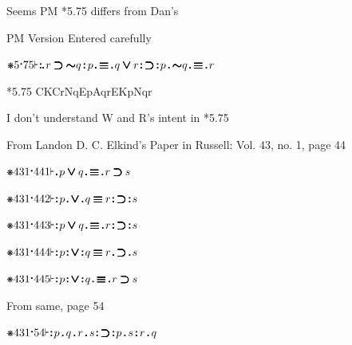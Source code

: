 \documentclass[12pt]{article}
\newcommand{\pmthm}{\mathpunct{\text{\scalebox{.5}[1]{$\boldsymbol\vdash$}}}} %
\newcommand{\pmast}{\text{\resizebox{!}{.75\height}{\ding{107}}}} %
\newcommand{\pmcdot}{\text{\raisebox{.05cm}{$\boldsymbol\cdot$}}} %
\newcommand{\pmd}{\hbox{\rule{.3ex}{.3ex}}} %
\newcommand{\pmdd}{\overset{\pmd}{\pmd}} %
\newcommand{\pmdot}{\mathinner{\pmd}}
\newcommand{\pmdott}{\mathinner{\pmdd}}
\newcommand{\pmdottt}{\mathinner{\pmdd\hspace{1pt}\pmd}}
\newcommand{\pmnot}{\mathord{\ooalign{$\boldsymbol{\sim}\mkern.5mu$\hidewidth\cr$\boldsymbol{\sim}$\cr\hidewidth$\mkern.5mu\boldsymbol{\sim}$}}}
\newcommand{\pmor}{\mathbin{\ooalign{$\boldsymbol{\vee}\mkern.5mu$\hidewidth\cr$\boldsymbol{\vee}$\cr\hidewidth$\mkern.5mu\boldsymbol{\vee}$}}}
\newcommand{\pmimp}{\mathbin{\ooalign{$\boldsymbol{\supset}\mkern.5mu$\hidewidth\cr$\boldsymbol{\supset}$\cr\hidewidth$\mkern.5mu\boldsymbol{\supset}$}}} %
\newcommand{\pmand}{\mathbin{\pmd}}%
\newcommand{\pmandd}{\mathbin{\pmdd}}
\newcommand{\pmiff}{\mathbin{\ooalign{$\boldsymbol{\equiv}\mkern.5mu$\hidewidth\cr$\boldsymbol{\equiv}$\cr\hidewidth$\mkern.5mu\boldsymbol{\equiv}$}}} %
\newcommand{\pmall}[1]{(#1)}
\newcommand{\pmsome}[1]{(\text{\raisebox{.5em}{\rotatebox{180}{\textbf{E}}}}#1)} %
\newcommand{\pmpf}[2]{#1#2} %
\begin{document}
Seems PM *5.75 differs from Dan's

PM Version Entered carefully

$\pmast 5 \pmcdot 75 \pmthm \pmdottt r \pmimp \pmnot q \pmandd p \pmdot \pmiff \pmdot q \pmor r \pmdott \pmimp \pmdott p \pmand \pmnot q \pmdot \pmiff \pmdot r       $

*5.75 CKCrNqEpAqrEKpNqr

I don't understand W and R's intent in *5.75










From Landon D. C. Elkind's Paper in Russell: Vol. 43, no. 1, page 44

$\pmast 431 \pmcdot 441 \pmthm \pmdot p \pmor q \pmdot \pmiff \pmdot r \pmimp s$

$\pmast 431 \pmcdot 442 \pmthm \pmdott p \pmdot \pmor \pmdot q \pmiff r \pmdott \pmimp \pmdott s$

$\pmast 431 \pmcdot 443 \pmthm \pmdott p \pmor q \pmdot \pmiff \pmdot r \pmdott \pmimp \pmdott s$

$\pmast 431 \pmcdot 444 \pmthm \pmdott p \pmdott \pmor \pmdott q \pmiff r \pmdot \pmimp \pmdot s$

$\pmast 431 \pmcdot 445 \pmthm \pmdott p \pmdott \pmor \pmdott q \pmdot \pmiff \pmdot r \pmimp s$

From same, page 54

$\pmast 431 \pmcdot 54 \pmthm \pmdott p \pmand q \pmand r \pmand s \pmdott \pmimp \pmdott p \pmand s \pmandd r \pmand q $ 

\end{document}

